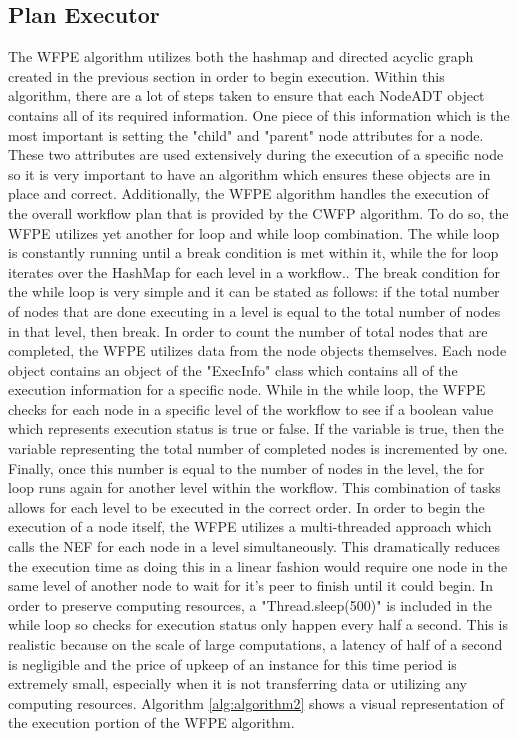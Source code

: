 \documentclass[fleqn,10pt]{SelfArx} %
\begin{document}
\subsection{Plan Executor}

The WFPE algorithm utilizes both the hashmap and directed acyclic graph created in the previous section in order to begin execution. Within this algorithm, there are a lot of steps taken to ensure that each NodeADT object contains all of its required information. One piece of this information which is the most important is setting the "child" and "parent" node attributes for a node. These two attributes are used extensively during the execution of a specific node so it is very important to have an algorithm which ensures these objects are in place and correct. Additionally, the WFPE algorithm handles the execution of the overall workflow plan that is provided by the CWFP algorithm. To do so, the WFPE utilizes yet another for loop and while loop combination. The while loop is constantly running until a break condition is met within it, while the for loop iterates over the HashMap for each level in a workflow.. The break condition for the while loop is very simple and it can be stated as follows: if the total number of nodes that are done executing in a level is equal to the total number of nodes in that level, then break. In order to count the number of total nodes that are completed, the WFPE utilizes data from the node objects themselves. Each node object contains an object of the "ExecInfo" class which contains all of the execution information for a specific node. While in the while loop, the WFPE checks for each node in a specific level of the workflow to see if a boolean value which represents execution status is true or false. If the variable is true, then the variable representing the total number of completed nodes is incremented by one. Finally, once this number is equal to the number of nodes in the level, the for loop runs again for another level within the workflow. This combination of tasks allows for each level to be executed in the correct order. In order to begin the execution of a node itself, the WFPE utilizes a multi-threaded approach which calls the NEF for each node in a level simultaneously. This dramatically reduces the execution time as doing this in a linear fashion would require one node in the same level of another node to wait for it's peer to finish until it could begin. In order to preserve computing resources, a "Thread.sleep(500)" is included in the while loop so checks for execution status only happen every half a second. This is realistic because on the scale of large computations, a latency of half of a second is negligible and the price of upkeep of an instance for this time period is extremely small, especially when it is not transferring data or utilizing any computing resources. Algorithm \ref{alg:algorithm2} shows a visual representation of the execution portion of the WFPE algorithm.
\end{document}
